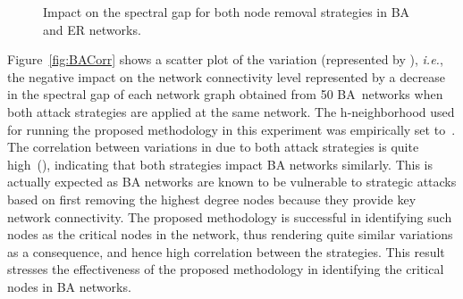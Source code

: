 \documentclass[conference,fleqn]{IEEEtran}
\begin{document}
\begin{figure*}[ht]
 \caption{Impact on the spectral gap  for both node removal strategies in BA and ER networks.}
 \label{fig:Corr}
 \end{figure*}
 


Figure~\ref{fig:BACorr} shows a scatter plot of the  variation (represented by ),
\textit{i.e.}, the negative impact on the network connectivity level represented by a decrease in the spectral gap
of each network graph obtained from 50 BA~networks when both attack strategies are applied at the same network. 
The h-neighborhood used for running the proposed methodology in this experiment was empirically set to~.
The correlation between variations in  due to both attack strategies is quite high~(), indicating
that both strategies impact BA networks similarly. This is actually expected as BA networks are known to be vulnerable to
strategic attacks based on first removing the highest degree nodes because they provide key network connectivity.
The proposed methodology is successful in identifying such nodes as the critical nodes in the network, thus rendering 
quite similar  variations as a consequence, and hence high correlation between the strategies.
This result stresses the effectiveness of the proposed methodology in identifying the critical nodes in BA networks.
\end{document}
